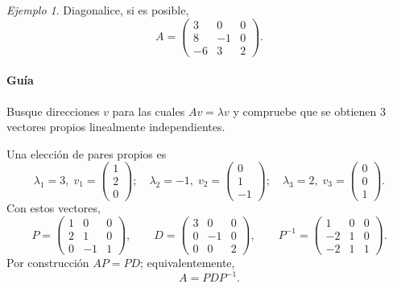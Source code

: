 \documentclass[12pt]{article}
\theoremstyle{remark}
\newtheorem{Ejem}[definicion]{Ejemplo}
\begin{document}
\begin{Ejem}


Diagonalice, si es posible,
\[
A=\begin{pmatrix}3 & 0 & 0\\8 & -1 & 0\\-6 & 3 & 2\end{pmatrix}.
\]

\paragraph{Guía}
Busque direcciones $v$ para las cuales $Av=\lambda v$ y compruebe que se obtienen $3$ vectores propios linealmente independientes.

\scriptsize
Una elección de pares propios es
\[
\lambda_1=3,\;v_1=\begin{pmatrix}1\\2\\0\end{pmatrix};\quad \lambda_2=-1,\;v_2=\begin{pmatrix}0\\1\\-1\end{pmatrix};\quad \lambda_3=2,\;v_3=\begin{pmatrix}0\\0\\1\end{pmatrix}.
\]
Con estos vectores,
\[
P=\begin{pmatrix}1 & 0 & 0\\2 & 1 & 0\\0 & -1 & 1\end{pmatrix},\qquad D=\begin{pmatrix}3 & 0 & 0\\0 & -1 & 0\\0 & 0 & 2\end{pmatrix},\qquad P^{-1}=\begin{pmatrix}1 & 0 & 0\\-2 & 1 & 0\\-2 & 1 & 1\end{pmatrix}.
\]
Por construcción $AP=PD$; equivalentemente,
\[
\boxed{A=PDP^{-1}}.
\]

\end{Ejem}
\end{document}
